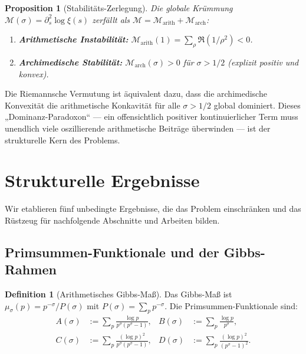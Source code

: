 \documentclass[12pt,a4paper]{article}
\newtheorem{proposition}[theorem]{Proposition}
\theoremstyle{definition}
\newtheorem{definition}[theorem]{Definition}
\theoremstyle{remark}
\newcommand{\muG}{\mu_\sigma}
\begin{document}
\begin{proposition}[Stabilitäts-Zerlegung]
\label{prop:stability}
Die globale Krümmung $\mathcal{M}(\sigma) = \partial_s^2\log\xi(s)$ zerfällt als $\mathcal{M} = \mathcal{M}_{\mathrm{arith}} + \mathcal{M}_{\mathrm{arch}}$:
\begin{enumerate}
  \item \textbf{Arithmetische Instabilität:} $\mathcal{M}_{\mathrm{arith}}(1) = \sum_\rho \Re(1/\rho^2) < 0$.
  \item \textbf{Archimedische Stabilität:} $\mathcal{M}_{\mathrm{arch}}(\sigma) > 0$ für $\sigma > 1/2$ (explizit positiv und konvex).
\end{enumerate}
\end{proposition}

\noindent Die Riemannsche Vermutung ist äquivalent dazu, dass die archimedische Konvexität die arithmetische Konkavität für alle $\sigma > 1/2$ global dominiert. Dieses „Dominanz-Paradoxon“ --- ein offensichtlich positiver kontinuierlicher Term muss unendlich viele oszillierende arithmetische Beiträge überwinden --- ist der strukturelle Kern des Problems.


\section{Strukturelle Ergebnisse}
\label{sec:structural}

Wir etablieren fünf unbedingte Ergebnisse, die das Problem einschränken und das Rüstzeug für nachfolgende Abschnitte und Arbeiten bilden.

\subsection{Primsummen-Funktionale und der Gibbs-Rahmen}

\begin{definition}[Arithmetisches Gibbs-Maß]
Das Gibbs-Maß ist $\muG(p) = p^{-\sigma}/P(\sigma)$ mit $P(\sigma) = \sum_p p^{-\sigma}$. Die Primsummen-Funktionale sind:
\begin{align*}
A(\sigma) &:= \sum_p \frac{\log p}{p^\sigma(p^\sigma - 1)}, &
B(\sigma) &:= \sum_p \frac{\log p}{p^\sigma},\\
C(\sigma) &:= \sum_p \frac{(\log p)^2}{p^\sigma(p^\sigma - 1)}, &
D(\sigma) &:= \sum_p \frac{(\log p)^2}{(p^\sigma - 1)^2}.
\end{align*}
\end{definition}
\end{document}
